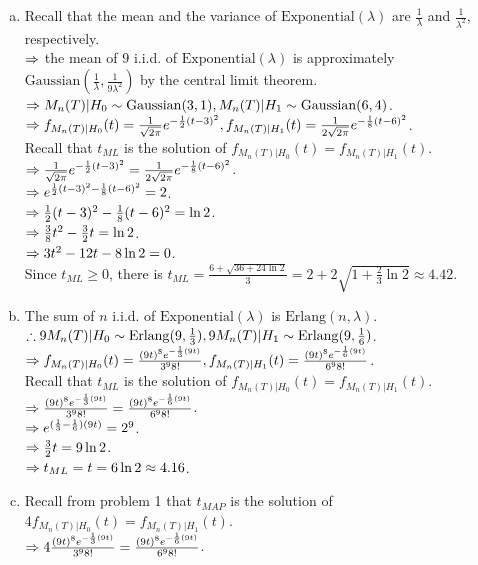 \begin{pr}$ $
\newcommand{\M}{M_n(T)}
\begin{enumerate}[(a)]
\item Recall that the mean and the variance of $\mathrm{Exponential}(\lambda)$ are $\frac1\lambda$ and $\frac1{\lambda^2}$, respectively.\\
$\Rightarrow$ the mean of $9$ i.i.d. of $\mathrm{Exponential}(\lambda)$ is approximately $\mathrm{Gaussian}(\frac1\lambda, \frac1{9\lambda^2})$ by the central limit theorem.\\
$\then\M|H_0\sim\mathrm{Gaussian}(3, 1), \M|H_1\sim\mathrm{Gaussian}(6, 4)$.\\
$\then f_{\M|H_0}(t)=\frac1{\sqrt{2\pi}}e^{-\frac12(t-3)^2}, f_{\M|H_1}(t)=\frac1{2\sqrt{2\pi}}e^{-\frac18(t-6)^2}$.\\
Recall that $t_{ML}$ is the solution of $f_{\M|H_0}(t)=f_{\M|H_1}(t)$.\\
$\Rightarrow\frac1{\sqrt{2\pi}}e^{-\frac12(t-3)^2}=\frac1{2\sqrt{2\pi}}e^{-\frac18(t-6)^2}$.\\
$\Rightarrow e^{\frac12(t-3)^2-\frac18(t-6)^2}=2$.\\
$\Rightarrow\frac12(t-3)^2-\frac18(t-6)^2=\ln2$.\\
$\Rightarrow\frac38t^2-\frac32t=\ln2$.\\
$\Rightarrow3t^2-12t-8\ln2=0$.\\
Since $t_{ML}\geq0$, there is $t_{ML}=\frac{6+\sqrt{36+24\ln2}}3=2+2\sqrt{1+\frac23\ln2}\approx4.42$.
\item The sum of $n$ i.i.d. of $\mathrm{Exponential}(\lambda)$ is $\mathrm{Erlang}(n, \lambda)$.\\
$\so9\M|H_0\sim\mathrm{Erlang}(9, \frac13), 9\M|H_1\sim\mathrm{Erlang}(9, \frac16)$.\\
$\then f_{\M|H_0}(t)=\frac{(9t)^8e^{-\frac13(9t)}}{3^98!}, f_{\M|H_1}(t)=\frac{(9t)^8e^{-\frac16(9t)}}{6^98!}$.\\
Recall that $t_{ML}$ is the solution of $f_{\M|H_0}(t)=f_{\M|H_1}(t)$.\\
$\Rightarrow\frac{(9t)^8e^{-\frac13(9t)}}{3^98!}=\frac{(9t)^8e^{-\frac16(9t)}}{6^98!}$.\\
$\Rightarrow e^{(\frac13-\frac16)(9t)}=2^9$.\\
$\Rightarrow\frac32t=9\ln2$.\\
$\Rightarrow t_{ML}=t=6\ln2\approx4.16$.
\item Recall from problem 1 that $t_{MAP}$ is the solution of $4f_{\M|H_0}(t)=f_{\M|H_1}(t)$.\\
$\Rightarrow4\frac{(9t)^8e^{-\frac13(9t)}}{3^98!}=\frac{(9t)^8e^{-\frac16(9t)}}{6^98!}$.\\

\end{enumerate}
\end{pr}
